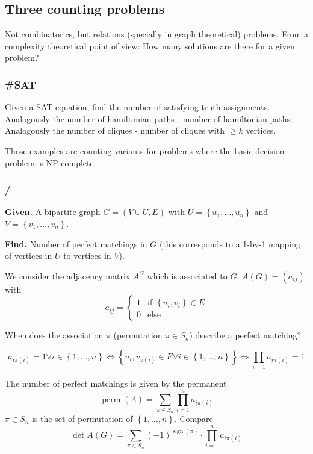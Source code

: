 \documentclass[a4paper]{article}
\newcommand{\given}[1]{\textbf{Given.} #1\par}
\newcommand{\find}[1]{\textbf{Find.} #1\par}
\newcommand{\cls}[1]{\rm{#1}}
\newcommand{\probl}[1]{\text{\textsc{#1}}}
\newcommand{\set}[1]{\left\{#1\right\}}
\newenvironment{spec}[0]{\begin{framed}}{\end{framed}}
\DeclareMathOperator{\detm}{det}
\begin{document}
\subsection{Three counting problems}
%
Not combinatorics, but relations (specially in graph theoretical) problems.
From a complexity theoretical point of view: How many solutions are there
for a given problem?

\subsubsection{\#SAT}
%
Given a SAT equation, find the number of satisfying truth assignments.
Analogously the number of hamiltonian paths - number of hamiltonian paths.
Analogously the number of cliques - number of cliques with $\geq k$ vertices.

Those examples are counting variants for problems where the basic decision problem
is \cls{NP}-complete.

\subsubsection{\probl{\#Matching} / \probl{Permanent}}
%
\begin{spec}
  \given{
    A bipartite graph $G = (V \cup U, E)$ with $U = \set{u_1, \ldots, u_n}$
    and $V = \set{v_1, \ldots, v_n}$.
  }
  \find{
    Number of perfect matchings in $G$
    (this corresponds to a 1-by-1 mapping of vertices in $U$ to vertices in $V$).
  }
\end{spec}

We consider the adjacency matrix $A^G$ which is associated to $G$.
$A(G) = (a_{ij})$ with \[
    a_{ij} = \begin{cases}
        1  & \text{if } \set{u_i, v_i} \in E \\
        0  & \text{else}
    \end{cases}
\]

When does the association $\pi$ (permutation $\pi \in S_n$) describe a perfect matching?

\[
    a_{i\pi(i)} = 1  \forall i \in \set{1, \ldots, n}
        \Leftrightarrow \set{u_i, v_{\pi(i)} \in E \forall i \in \set{1, \ldots, n}}
        \Leftrightarrow \prod_{i=1} a_{i\pi(i)} = 1
\]

The number of perfect matchings is given by the permanent
\[
    \operatorname{perm}(A) = \sum_{\pi \in S_n} \prod_{i=1}^n a_{i\pi(i)}
\]
$\pi \in S_n$ is the set of permutation of $\set{1, \ldots, n}$. Compare
\[
    \detm{A(G)} = \sum_{\pi \in S_n} (-1)^{\operatorname{sign}(\pi)}
        \cdot \prod_{i=1}^n a_{i\pi(i)}
\]
\end{document}
